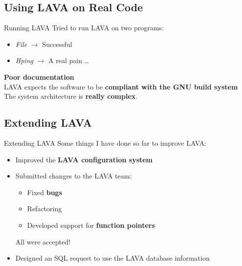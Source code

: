 \documentclass[aspectratio=169]{beamer}
\begin{document}
  \subsection{Using LAVA on Real Code}

  \begin{frame}{Running LAVA}
    Tried to run LAVA on two programs:
    \begin{itemize}
    \item \textit{File} $\rightarrow$ \textcolor{custom-green}{Successful}
    \item \textit{Hping} $\rightarrow$ \textcolor{custom-red}{A real pain \ldots}
    \end{itemize}
    \pause
    \vspace{0.5em}
    \textbf{Poor documentation} \\
    \vspace{0.3em}
    LAVA expects the software to be \textbf{compliant with the GNU build system} \\
    \vspace{0.3em}
    The system architecture is \textbf{really complex}.
  \end{frame}

  \subsection{Extending LAVA}

  \begin{frame}{Extending LAVA}
    Some things I have done so far to improve LAVA:
    \begin{itemize}
    \setlength\itemsep{1em}
    \item Improved the \textbf{LAVA configuration system}
    \item Submitted changes to the LAVA team:
      \begin{itemize}
        \item Fixed \textbf{bugs}
        \item Refactoring
        \item Developed support for \textbf{function pointers}
      \end{itemize}
      All were \textcolor{custom-green}{accepted}!
    \item Designed an SQL request to \alert{use the LAVA database information}
    \end{itemize}
  \end{frame}
\end{document}
